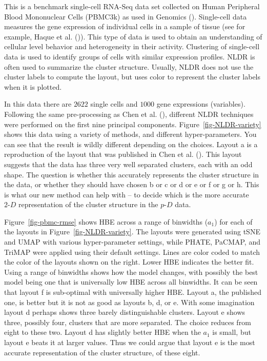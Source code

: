 \documentclass[
  11pt,
  a4paper,
]{report}
\newcommand\pD{$p\text{-}D$}
\newcommand\gD{$2\text{-}D$}
\begin{document}
This is a benchmark single-cell RNA-Seq data set collected on Human
Peripheral Blood Mononuclear Cells (PBMC3k) as used in Genomics
(). Single-cell data measures the gene
expression of individual cells in a sample of tissue (see for example,
Haque et al. ()). This type of data is
used to obtain an understanding of cellular level behavior and
heterogeneity in their activity. Clustering of single-cell data is used
to identify groups of cells with similar expression profiles. NLDR is
often used to summarize the cluster structure. Usually, NLDR does not
use the cluster labels to compute the layout, but uses color to
represent the cluster labels when it is plotted.

In this data there are \(2622\) single cells and \(1000\) gene
expressions (variables). Following the same pre-processing as Chen et
al. (), different NLDR techniques were
performed on the first nine principal components.
Figure~\ref{fig-NLDR-variety} shows this data using a variety of
methods, and different hyper-parameters. You can see that the result is
wildly different depending on the choices. Layout a is a reproduction of
the layout that was published in Chen et al.
(). This layout suggests that the data has
three very well separated clusters, each with an odd shape. The question
is whether this accurately represents the cluster structure in the data,
or whether they should have chosen b or c or d or e or f or g or h. This
is what our new method can help with -- to decide which is the more
accurate \gD{} representation of the cluster structure in the \pD{}
data.

Figure~\ref{fig-pbmc-rmse} shows HBE across a range of binwidths
(\(a_1\)) for each of the layouts in Figure~\ref{fig-NLDR-variety}. The
layouts were generated using tSNE and UMAP with various hyper-parameter
settings, while PHATE, PaCMAP, and TriMAP were applied using their
default settings. Lines are color coded to match the color of the
layouts shown on the right. Lower HBE indicates the better fit. Using a
range of binwidths shows how the model changes, with possibly the best
model being one that is universally low HBE across all binwidths. It can
be seen that layout f is sub-optimal with universally higher HBE. Layout
a, the published one, is better but it is not as good as layouts b, d,
or e. With some imagination layout d perhaps shows three barely
distinguishable clusters. Layout e shows three, possibly four, clusters
that are more separated. The choice reduces from eight to these two.
Layout d has slightly better HBE when the \(a_1\) is small, but layout e
beats it at larger values. Thus we could argue that layout e is the most
accurate representation of the cluster structure, of these eight.
\end{document}

